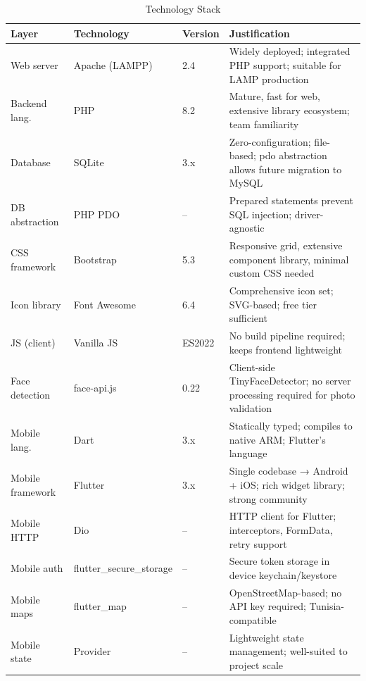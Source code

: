 \documentclass[12pt,a4paper,openright]{report}
\begin{document}
\begin{table}[H]
\centering
\caption{Technology Stack}
\label{tab:tech-stack}
\begin{tabularx}{\textwidth}{l l l X}
\toprule
\textbf{Layer} & \textbf{Technology} & \textbf{Version} & \textbf{Justification} \\
\midrule
Web server      & Apache (LAMPP)  & 2.4   & Widely deployed; integrated PHP support; suitable for LAMP production \\
Backend lang.   & PHP             & 8.2   & Mature, fast for web, extensive library ecosystem; team familiarity \\
Database        & SQLite          & 3.x   & Zero-configuration; file-based; \gls{pdo} abstraction allows future migration to MySQL \\
DB abstraction  & PHP PDO         & --    & Prepared statements prevent SQL injection; driver-agnostic \\
CSS framework   & Bootstrap       & 5.3   & Responsive grid, extensive component library, minimal custom CSS needed \\
Icon library    & Font Awesome    & 6.4   & Comprehensive icon set; SVG-based; free tier sufficient \\
JS (client)     & Vanilla JS      & ES2022& No build pipeline required; keeps frontend lightweight \\
Face detection  & face-api.js     & 0.22  & Client-side TinyFaceDetector; no server processing required for photo validation \\
Mobile lang.    & Dart            & 3.x   & Statically typed; compiles to native ARM; Flutter's language \\
Mobile framework & Flutter        & 3.x   & Single codebase → Android + iOS; rich widget library; strong community \\
Mobile HTTP     & Dio             & --    & HTTP client for Flutter; interceptors, FormData, retry support \\
Mobile auth     & flutter\_secure\_storage & -- & Secure token storage in device keychain/keystore \\
Mobile maps     & flutter\_map    & --    & OpenStreetMap-based; no API key required; Tunisia-compatible \\
Mobile state    & Provider        & --    & Lightweight state management; well-suited to project scale \\
\bottomrule
\end{tabularx}
\end{table}
\end{document}
